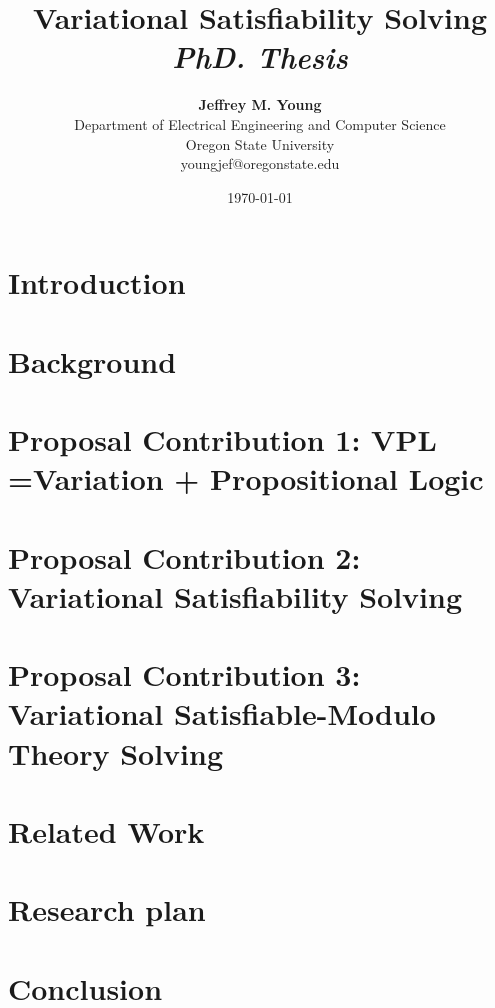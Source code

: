 \documentclass[11pt]{article}
\title{{\bf Variational Satisfiability Solving} \\
\it PhD. Thesis}%
\author{{\bf Jeffrey M. Young}  \\
Department of Electrical Engineering and Computer Science \\
Oregon State University\\
{\small youngjef@oregonstate.edu}
}
\date{\today}
\begin{document}
\pagestyle{plain}
\maketitle

\begin{abstract}
  
\end{abstract}


\section{Introduction}


\section{Background}


\section{Proposal Contribution 1: VPL =\@ Variation + Propositional Logic}


\section{Proposal Contribution 2: Variational Satisfiability Solving}


\section{Proposal Contribution 3: Variational Satisfiable-Modulo Theory Solving}


\section{Related Work}


\section{Research plan}


\section{Conclusion}

\end{document}
